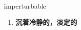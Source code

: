 
\begin{frame}
{\huge imperturbable}
\begin{center}
\begin{enumerate}\Large
  \item \textbf{沉着冷静的，淡定的}
\end{enumerate}
\end{center}
\end{frame}
